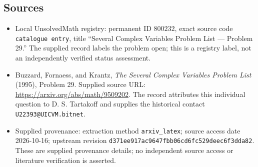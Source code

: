 \documentclass[11pt]{article}
\begin{document}
\subsection{Sources}
\begin{itemize}
\item Local UnsolvedMath registry: permanent ID \(800232\), exact source code \texttt{catalogue entry}, title ``Several Complex Variables Problem List --- Problem 29.'' The supplied record labels the problem open; this is a registry label, not an independently verified status assessment.
\item Buzzard, Fornaess, and Krantz, \emph{The Several Complex Variables Problem List} (1995), Problem 29. Supplied source URL: \url{https://arxiv.org/abs/math/9509202}. The record attributes this individual question to D. S. Tartakoff and supplies the historical contact \texttt{U22393@UICVM.bitnet}.
\item Supplied provenance: extraction method \texttt{arxiv\_latex}; source access date 2026-10-16; upstream revision \texttt{d371ee917ac9647fbb06cd6fc529deec6f3dda82}. These are supplied provenance details; no independent source access or literature verification is asserted.
\end{itemize}
\end{document}
